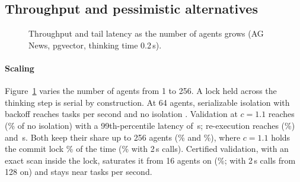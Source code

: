 \documentclass[sigconf, nonacm, review]{acmart}
\begin{document}
\subsection{Throughput and pessimistic alternatives}
\label{sec:eval-perf}

\begin{figure}[t]
\centering
{}
\caption{Throughput and tail latency as the number of agents grows
  (AG News, pgvector, thinking time 0.2\,s).}
\label{fig:scale}
\end{figure}

\paragraph{Scaling}
Figure~\ref{fig:scale} varies the number of agents from 1 to 256. A
lock held across the thinking step is serial by construction. At 64
agents, serializable isolation with backoff reaches
 tasks per second and no isolation
. Validation at $c=1.1$ reaches
 (\% of no isolation) with a 99th-percentile
latency of \,s; re-execution reaches
 (\%) and \,s.
Both keep their share up to 256 agents (\% and
\%), where $c=1.1$ holds the commit lock
\% of the time (\% with 2\,s
calls). Certified validation, with an exact scan inside the lock,
saturates it from 16 agents on (\%; with 2\,s calls
from 128 on) and stays near  tasks per second.
\end{document}
